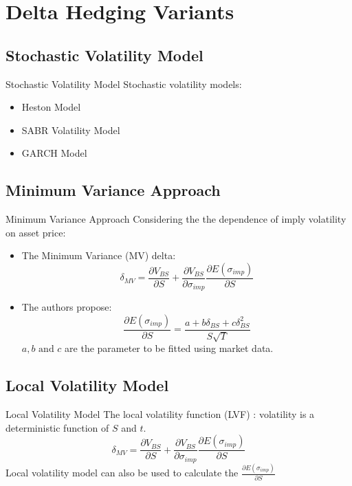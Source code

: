 \documentclass[10pt,table,mathserif]{beamer}
\begin{document}
\section{Delta Hedging Variants}
\subsection{Stochastic Volatility Model}
\begin{frame}{Stochastic Volatility Model}
Stochastic volatility models:
\begin{itemize}
  \item Heston Model
  \item SABR Volatility Model
  \item GARCH Model
\end{itemize}
\end{frame}



\subsection{Minimum Variance Approach}
\begin{frame}{Minimum Variance Approach}
Considering the  the dependence of imply volatility on asset price:
\begin{itemize}
\item The  Minimum Variance (MV) delta:
\[
\delta_{MV}=\frac{\partial V_{BS}}{\partial S}+\frac{\partial V_{BS}}{\partial \sigma_{imp}}\frac{\partial E(\sigma_{imp})}{ \partial S}
\]
\item The authors \footnotemark propose:
\begin{equation}
\frac{\partial E(\sigma_{imp})}{ \partial S}=\frac{a+b\delta_{BS}+c \delta_{BS}^2}{S\sqrt{T}}
\end{equation}
$a, b \text{ and  } c$ are the parameter to be fitted using market data.
\end{itemize}
\end{frame}

\subsection{Local Volatility Model}
\begin{frame}{Local Volatility Model}
The local volatility function (LVF) \footnotemark : volatility is a deterministic function of $S$ and $t$.
 \[
\delta_{MV}=\frac{\partial V_{BS}}{\partial S}+\frac{\partial V_{BS}}{\partial \sigma_{imp}}\frac{\partial E(\sigma_{imp})}{ \partial S}
\]
Local volatility model can also be used to calculate the $\frac{\partial E(\sigma_{imp})}{ \partial S}$


\end{frame}
\end{document}
